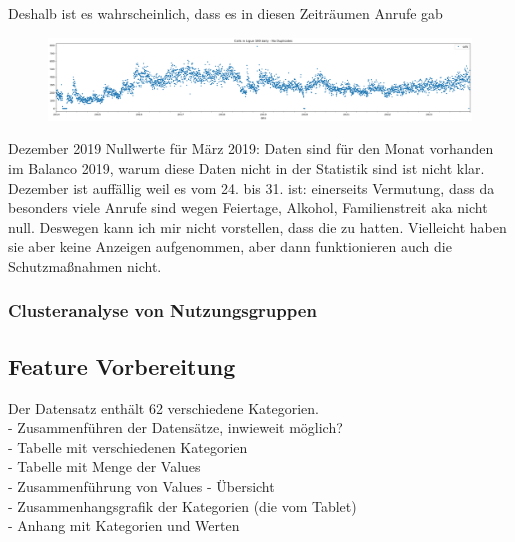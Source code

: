 \documentclass[12pt]{report}
\begin{document}
	Deshalb ist es wahrscheinlich, dass es in diesen Zeiträumen Anrufe gab %
	
 \begin{figure}
		\centering
		\includegraphics[width=1\linewidth]{screenshot002}
		\caption{}
		\label{fig:screenshot002}
	\end{figure}
	Dezember 2019
	Nullwerte für März 2019: Daten sind für den Monat vorhanden im Balanco 2019, warum diese Daten nicht in der Statistik sind ist nicht klar.
	Dezember ist auffällig weil es vom 24. bis 31. ist: einerseits Vermutung, dass da besonders viele Anrufe sind wegen Feiertage, Alkohol, Familienstreit aka nicht null. Deswegen kann ich mir nicht vorstellen, dass die zu hatten. Vielleicht haben sie aber keine Anzeigen aufgenommen, aber dann funktionieren auch die Schutzmaßnahmen nicht. 
	
	\subsubsection{Clusteranalyse von Nutzungsgruppen}
	\subsection{Feature Vorbereitung}
	Der Datensatz enthält 62 verschiedene Kategorien. \\
	- Zusammenführen der Datensätze, inwieweit möglich? \\
	- Tabelle mit verschiedenen Kategorien \\
	- Tabelle mit Menge der Values\\
	- Zusammenführung von Values - Übersicht\\
	- Zusammenhangsgrafik der Kategorien (die vom Tablet) \\
	- Anhang mit Kategorien und Werten\\
\end{document}
